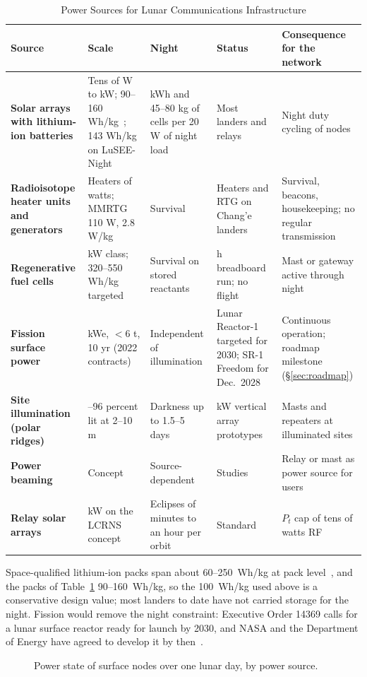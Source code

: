 \documentclass{IEEEoj}
\begin{document}
\begin{table}[!t]
\caption{Power Sources for Lunar Communications Infrastructure}
\label{tab:power}
\centering
\footnotesize
\begin{tabularx}{\textwidth}{@{}>{\raggedright\arraybackslash\bfseries}p{3.4cm}>{\raggedright\arraybackslash}p{3.0cm}>{\raggedright\arraybackslash}p{2.8cm}>{\raggedright\arraybackslash}p{3.0cm}>{\raggedright\arraybackslash}X}
\toprule
\rowcolor{tabhead}\textbf{Source} & \textbf{Scale} & \textbf{Night} & \textbf{Status} & \textbf{Consequence for the network} \\
\midrule
Solar arrays with lithium-ion batteries & Tens of W to kW; 90--160 Wh/kg~\cite{manzo2009,gilligan_rfc2023}; 143 Wh/kg on LuSEE-Night~\cite{aguirre_lusee} & 7 kWh and 45--80 kg of cells per 20 W of night load & Most landers and relays & Night duty cycling of nodes \\
Radioisotope heater units and generators & Heaters of watts; MMRTG 110 W, 2.8 W/kg~\cite{mmrtg} & Survival & Heaters and RTG on Chang'e landers~\cite{li_ce4rtg2023} & Survival, beacons, housekeeping; no regular transmission \\
Regenerative fuel cells & kW class; 320--550 Wh/kg targeted~\cite{gilligan_rfc2023} & Survival on stored reactants & 550 h breadboard run; no flight~\cite{cain_rfc2026} & Mast or gateway active through night \\
Fission surface power & 40 kWe, ${<}6$ t, 10 yr (2022 contracts)~\cite{nasa_fsp2024} & Independent of illumination & Lunar Reactor-1 targeted for 2030; SR-1 Freedom for Dec.\ 2028~\cite{nasa_sr1_2026} & Continuous operation; roadmap milestone (\S\ref{sec:roadmap}) \\
Site illumination (polar ridges) & 92--96 percent lit at 2--10 m~\cite{glaser2014} & Darkness up to 1.5--5 days~\cite{mazarico2011,glaser2014} & 10 kW vertical array prototypes~\cite{pappa_vsat2021,nasa_vsat2022} & Masts and repeaters at illuminated sites \\
Power beaming & Concept & Source-dependent & Studies~\cite{beacon_demo} & Relay or mast as power source for users \\
Relay solar arrays & 1.1 kW on the LCRNS concept~\cite{lcrns_esper2025} & Eclipses of minutes to an hour per orbit & Standard & $P_t$ cap of tens of watts RF \\
\bottomrule
\end{tabularx}
\end{table}
Space-qualified lithium-ion packs span about \SI{60}{}--\SI{250}{Wh/kg} at pack level~\cite{nasa_soa_power2026}, and the packs of Table~\ref{tab:power} \SI{90}{}--\SI{160}{Wh/kg}, so the \SI{100}{Wh/kg} used above is a conservative design value; most landers to date have not carried storage for the night. Fission would remove the night constraint: Executive Order 14369 calls for a lunar surface reactor ready for launch by 2030, and NASA and the Department of Energy have agreed to develop it by then~\cite{eo14369,nasa_doe2026}.
\begin{figure}[!t]
\centering
\resizebox{\textwidth}{!}{}
\caption{Power state of surface nodes over one lunar day, by power source.}
\label{fig:powertimeline}
\end{figure}
\end{document}

